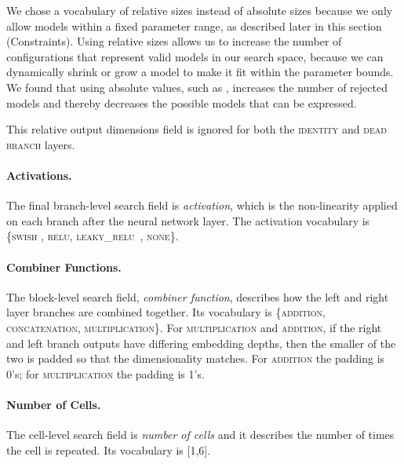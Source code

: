 \documentclass{article}
\begin{document}
We chose a vocabulary of relative sizes instead of absolute sizes because we only allow models within a fixed parameter range, as described later in this section (Constraints). Using relative sizes allows us to increase the number of configurations that represent valid models in our search space, because we can dynamically shrink or grow a model to make it fit within the parameter bounds. We found that using absolute values, such as , increases the number of rejected models and thereby decreases the possible models that can be expressed.

This relative output dimensions field is ignored for both the \textsc{identity} and \textsc{dead branch} layers.

\paragraph{Activations.} The final branch-level search field is \textit{activation}, which is the non-linearity applied on each branch after the neural network layer. The activation vocabulary is \{\textsc{swish} \cite{ramachandran17,elfwing2018sigmoid}, \textsc{relu}, \textsc{leaky\_relu~\cite{maas2013rectifier}}, \textsc{none}\}.

\paragraph{Combiner Functions.} The block-level search field, \textit{combiner function}, describes how the left and right layer branches are combined together. Its vocabulary is \{\textsc{addition}, \textsc{concatenation}, \textsc{multiplication}\}. For \textsc{multiplication} and \textsc{addition}, if the right and left branch outputs have differing embedding depths, then the smaller of the two is padded so that the dimensionality matches. For \textsc{addition} the padding is 0's; for \textsc{multiplication} the padding is 1's.

\paragraph{Number of Cells.} The cell-level search field is \textit{number of cells} and it describes the number of times the cell is repeated. Its vocabulary is [1,6].
\end{document}
